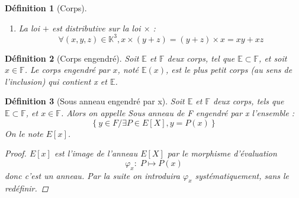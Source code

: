 \documentclass[a4paper,12pt,french,draft]{report}
\newtheorem{definition}{Définition}[section]
\begin{document}
\begin{definition}[Corps]
\begin{enumerate}
\[\begin{array}{lll}
								\end{array}
								\right.
							\]
					\item La loi \( + \) est distributive sur la loi \( \times \) :
						\[
						\forall (x, y, z) \in \mathbb{K}^3, x \times (y + z) = (y + z) \times x = xy + xz
						\]
				\end{enumerate}
			
			\end{definition}
			
			\begin{definition}[Corps engendré]
				Soit \(\mathbb{E}\) et \(\mathbb{F}\) deux corps, tel que \(\mathbb{E} \subset \mathbb{F}\), et soit \(x \in \mathbb{F} \). Le corps engendré par \(x\), noté \(\mathbb{E}(x)\), est le plus petit corps (au sens de l'inclusion) qui contient x et \(\mathbb{E}\).
			\end{definition}
			
			\begin{definition}[Sous anneau engendré par x]
				Soit \(\mathbb{E}\) et \(\mathbb{F}\) deux corps, tels que \(\mathbb{E}\subset\mathbb{F}\), et \(x\in\mathbb{F}\). Alors on appelle \emph{Sous anneau de F engendré par x} l'ensemble :
				\[\left\{y\in F / \exists P \in E[X], y = P(x)\right\}\]
				On le note \(E[x]\).{}
				
				\begin{proof}
					\(E[x]\) est l'image de l'anneau \(E[X]\) par le morphisme d'évaluation \[\varphi_{x} : \; P \mapsto P(x) \] donc c'est un anneau. Par la suite on introduira \(\varphi_{x}\) systématiquement, sans le redéfinir.
				\end{proof}
				
			\end{definition}
			
\end{document}
